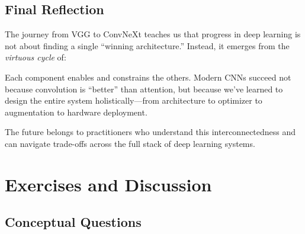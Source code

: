 \documentclass{article}
\begin{document}
\subsection{Final Reflection}

\begin{tcolorbox}[colback=blue!5!white, colframe=blue!75!black, title=The Deeper Lesson]
The journey from VGG to ConvNeXt teaches us that progress in deep learning is not about finding a single ``winning architecture.'' Instead, it emerges from the \textit{virtuous cycle} of:

\begin{center}
\end{center}

Each component enables and constrains the others. Modern CNNs succeed not because convolution is ``better'' than attention, but because we've learned to design the entire system holistically---from architecture to optimizer to augmentation to hardware deployment.

The future belongs to practitioners who understand this interconnectedness and can navigate trade-offs across the full stack of deep learning systems.
\end{tcolorbox}

\section{Exercises and Discussion}

\subsection{Conceptual Questions}
\end{document}
